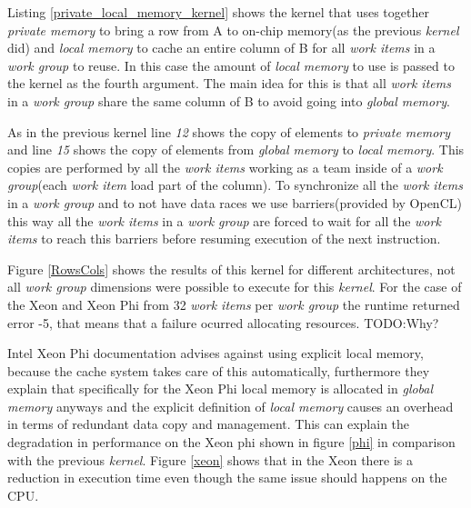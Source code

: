 
\par{Listing \ref{private_local_memory_kernel} shows the kernel that uses 
    together \emph{private memory} to bring a row from A to 
    on-chip memory(as the previous \emph{kernel} did) and 
    \emph{local memory} to cache an entire column of B for all \emph{work items} 
    in a \emph{work group} to reuse. In 
    this case the amount of \emph{local memory} to use is passed to the kernel
    as the fourth argument. The main idea for this is
    that all \emph{work items} in a \emph{work group} share the same column of 
    B to avoid going into \emph{global memory}.}

\par{As in the previous kernel line \emph{12} shows the copy of elements to 
    \emph{private memory} and line \emph{15} shows the 
    copy of elements from \emph{global memory} to \emph{local memory}. This 
    copies are performed by all the \emph{work items} working as a team inside
    of a \emph{work group}(each \emph{work item} load part of the column). 
    To synchronize all the \emph{work items} in a 
    \emph{work group} and to not have data races we use barriers(provided
    by OpenCL) this way all the \emph{work items} in a \emph{work group}
    are forced to wait for all the \emph{work items} to reach this barriers 
    before resuming execution of the next instruction.}

\par{Figure \ref{RowsCols} shows the results of this kernel for different 
    architectures, not all \emph{work group} dimensions 
    were possible to execute for this \emph{kernel}. For the case of the Xeon 
    and Xeon Phi from 32 \emph{work items} per \emph{work group} 
    the runtime returned error -5, that means that a failure ocurred allocating 
    resources\cite{opencl_error}. {\color{red} TODO:Why?}}

\par{Intel Xeon Phi documentation\cite{opencl_phi} advises against using explicit
    local memory, because the cache system takes care of this automatically, 
    furthermore they explain that specifically for the Xeon Phi
    local memory is allocated in 
    \emph{global memory} anyways and the explicit definition of \emph{local
    memory} causes an overhead in terms of redundant data copy and management.
    This can explain the degradation in performance on the Xeon phi shown in
    figure \ref{phi} in comparison with the previous \emph{kernel}. Figure \ref{xeon}
    shows that in the Xeon there is a reduction in execution time even though
    the same issue should happens on the CPU.}

